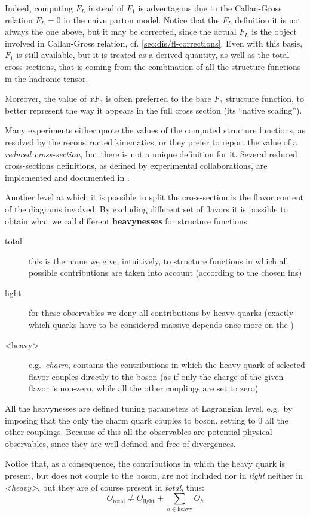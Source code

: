 Indeed, computing $F_L$ instead of $F_1$ is adventagous due to the Callan-Gross
relation \cite{Callan:1969uq} $F_L=0$ in the naive parton model.
Notice that the $F_L$ definition it is not always the one above, but it may be
corrected, since the actual $F_L$ is the object involved in Callan-Gross
relation, cf. \cref{sec:dis/fl-corrections}.
%
Even with this basis, $F_1$ is still available, but it is treated as a derived
quantity, as well as the total cross sections, that is coming from the
combination of all the structure functions in the hadronic tensor.

Moreover, the value of $xF_3$ is often preferred to the bare $F_3$ structure
function, to better represent the way it appears in the full cross section (its
\enquote{native scaling}).

Many experiments either quote the values of the computed structure functions,
as resolved by the reconstructed kinematics, or they prefer to report the value
of a \textit{reduced cross-section}, but there is not a unique definition for
it.
Several reduced cross-sections definitions, as defined by experimental
collaborations, are implemented and documented in \yadism.

Another level at which it is possible to split the \dis cross-section is the
flavor content of the diagrams involved.
By excluding different set of flavors it is possible to obtain what we call
different \textbf{heavynesses} for structure functions:
\begin{description}
  \item[total] this is the name we give, intuitively, to structure functions in
    which all possible contributions are taken into account (according to the
    chosen \acrlong{fns})
  \item[light] for these observables we deny all contributions by heavy quarks
    (exactly which quarks have to be considered massive depends once more on
    the \fns)
  \item[<heavy>] e.g.\ \textit{charm}, contains the contributions in which the
    heavy quark of selected flavor couples directly to the \ew boson (as if
    only the charge of the given flavor is non-zero, while all the other
    couplings are set to zero)
\end{description}

All the heavynesses are defined tuning parameters at Lagrangian level, e.g.\ by
imposing that the only the charm quark couples to \ew boson, setting to 0 all
the other couplings.
Because of this all the observables are potential physical observables, since
they are well-defined and free of divergences.

Notice that, as a consequence, the contributions in which the heavy quark is
present, but does not couple to the \ew boson, are not included nor in
\textit{light} neither in \textit{<heavy>}, but they are of course present in
\textit{total}, thus:
\begin{equation}
  O_{\text{total}} \neq O_{\text{light}} + \sum_{h \in \text{heavy}} O_h 
\end{equation}

